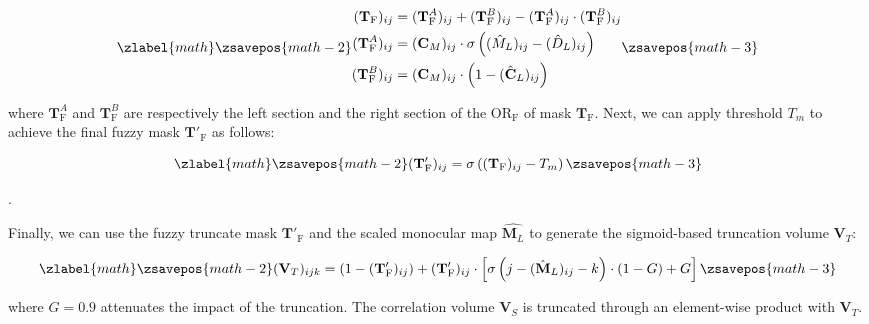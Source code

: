 \documentclass[10pt,twocolumn,letterpaper]{article}
\begin{document}
\small

\begin{equation}
\zlabel{math}
    \zsavepos{math-2}
    \begin{split}
        (\mathbf{T}_\text{F})_{ij} &= (\mathbf{T}^A_\text{F})_{ij} + (\mathbf{T}^B_\text{F})_{ij} - (\mathbf{T}^A_\text{F})_{ij} \cdot (\mathbf{T}^B_\text{F})_{ij}\\
        (\mathbf{T}^A_\text{F})_{ij} &= (\mathbf{C}_M)_{ij} \cdot \sigma\left( (\hat{M}_L)_{ij} - (\hat{D}_L)_{ij} \right)\\
        (\mathbf{T}^B_\text{F})_{ij} &= (\mathbf{C}_M)_{ij} \cdot \left(1-(\hat{\mathbf{C}}_L)_{ij}\right)
    \end{split}
    \label{eq:truncate_mask_fuzzy}
    \zsavepos{math-3}\end{equation}

\normalsize
where $\mathbf{T}^A_\text{F}$ and $\mathbf{T}^B_\text{F}$ are respectively the left section and the right section of the $\text{OR}_\text{F}$ of mask $\textbf{T}_\text{F}$.
Next, we can apply threshold $T_m$ to achieve the final fuzzy mask $\mathbf{T}'_\text{F}$ as follows:

\small

\begin{equation}
\zlabel{math}
    \zsavepos{math-2}
    (\mathbf{T}'_\text{F})_{ij}=\sigma\left((\mathbf{T}_\text{F})_{ij}-T_m\right)
    \label{eq:truncate_mask_fuzzy_thresholded}
    \zsavepos{math-3}\end{equation}

\normalsize.

Finally, we can use the fuzzy truncate mask $\mathbf{T}'_\text{F}$ and the scaled monocular map $\hat{\mathbf{M}_L}$ to generate the sigmoid-based truncation volume $\mathbf{V}_T$:

\small

\begin{equation}
\zlabel{math}
    \zsavepos{math-2}
    (\mathbf{V}_T)_{ijk} = \left(1-(\mathbf{T}'_\text{F})_{ij}\right) + (\mathbf{T}'_\text{F})_{ij} \cdot \left[ \sigma\left(j - (\hat{\mathbf{M}}_L)_{ij} - k\right) \cdot (1-G) + G \right]
    \label{eq:truncate_vol}
    \zsavepos{math-3}\end{equation}

\normalsize
where $G=0.9$ attenuates the impact of the truncation.
The correlation volume $\mathbf{V}_S$ is truncated through an element-wise product with $\mathbf{V}_T$.
\end{document}
